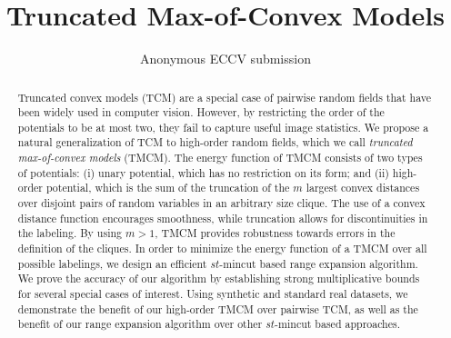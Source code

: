\documentclass[runningheads]{llncs}
\begin{document}
\pagestyle{headings}
\mainmatter
\def\ECCV16SubNumber{***}  %

\title{Truncated Max-of-Convex Models} %



\author{Anonymous ECCV submission}

\maketitle

\vspace{-5mm}
\begin{abstract}
Truncated convex models (TCM) are a special case of pairwise random fields that have been widely used
in computer vision. However, by restricting the order of the potentials to be at most two, they
fail to capture useful image statistics. We propose a natural generalization of TCM
to high-order random fields, which we call {\em truncated max-of-convex models} (TMCM). The energy
function of TMCM consists of two types of potentials: (i) unary potential, which has no
restriction on its form; and (ii) high-order potential, which is the sum of the truncation
of the $m$ largest convex distances over disjoint pairs of random variables in an arbitrary size
clique. The use of a convex distance function encourages smoothness, while truncation allows for discontinuities
in the labeling. By using $m > 1$, TMCM provides robustness towards errors in the definition of the cliques.
In order to minimize the energy function of a TMCM over all possible labelings,
we design an efficient $st$-{\sc mincut} based range expansion algorithm. We prove the accuracy
of our algorithm by establishing strong multiplicative bounds for several special cases of
interest. Using synthetic and standard real datasets, we demonstrate the benefit of our high-order TMCM over pairwise TCM, as well as the benefit of our range expansion algorithm over other $st$-{\sc mincut} based approaches.

\end{abstract}
\end{document}
